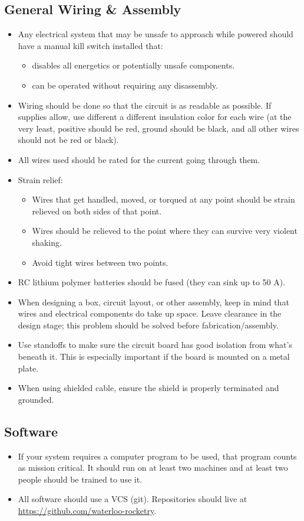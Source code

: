 \documentclass{article}
\begin{document}
\subsection{General Wiring \& Assembly}
\begin{itemize}
\item Any electrical system that may be unsafe to approach while powered should have a manual kill switch installed that:
    \begin{itemize}
    \item disables all energetics or potentially unsafe components.
    \item can be operated without requiring any disassembly.
    \end{itemize}
\item Wiring should be done so that the circuit is as readable as possible. If supplies allow, use different a different insulation color for each wire (at the very least, positive should be red, ground should be black, and all other wires should not be red or black).
\item All wires used should be rated for the current going through them.
\item Strain relief:
    \begin{itemize}
    \item Wires that get handled, moved, or torqued at any point should be strain relieved on both sides of that point.
    \item Wires should be relieved to the point where they can survive very violent shaking.
    \item Avoid tight wires between two points.
    \end{itemize}
\item RC lithium polymer batteries should be fused (they can sink up to 50 A).
\item When designing a box, circuit layout, or other assembly, keep in mind that wires and electrical components do take up space. Leave clearance in the design stage; this problem should be solved before fabrication/assembly.
\item Use standoffs to make sure the circuit board has good isolation from what's beneath it. This is especially important if the board is mounted on a metal plate.
\item When using shielded cable, ensure the shield is properly terminated and grounded.
\end{itemize}

\subsection{Software}
\begin{itemize}
\item If your system requires a computer program to be used, that program counts as mission critical. It should run on at least two machines and at least two people should be trained to use it.
\item All software should use a VCS (git). Repositories should live at \url{https://github.com/waterloo-rocketry}.
\end{itemize}
\end{document}
